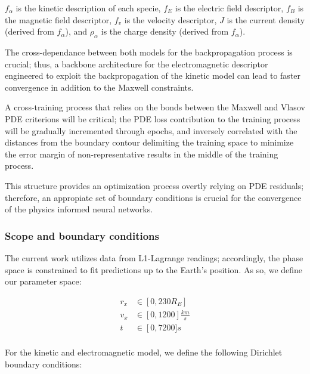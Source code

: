 \documentclass[12pt]{article}
\begin{document}
$f_\alpha$ is the kinetic description of each specie, $f_E$ is the electric field descriptor, $f_B$ is the magnetic field descriptor, $f_v$ is the velocity descriptor, $J$ is the current density (derived from $f_\alpha$), and $\rho_\alpha$ is the charge density (derived from $f_\alpha$).

The cross-dependance between both models for the backpropagation process is crucial; thus, a backbone architecture for the electromagnetic descriptor engineered to exploit the backpropagation of the kinetic model can lead to faster convergence in addition to the Maxwell constraints.

A cross-training process that relies on the bonds between the Maxwell and Vlasov PDE criterions will be critical; the PDE loss contribution to the training process will be gradually incremented through epochs, and inversely correlated with the distances from the boundary contour delimiting the training space to minimize the error margin of non-representative results in the middle of the training process.

This structure provides an optimization process overtly relying on PDE residuals; therefore, an appropiate set of boundary conditions is crucial for the convergence of the physics informed neural networks.

\subsubsection{Scope and boundary conditions}
The current work utilizes data from L1-Lagrange readings; accordingly, the phase space is constrained to fit predictions up to the Earth's position. As so, we define our parameter space:

\begin{align*}
    r_x &\in \left[0, 230R_E\right] \\
    v_x &\in \left[0, 1200\right]\frac{km}{s} \\
    t &\in \left[0, 7200]s \\
\end{align*}

For the kinetic and electromagnetic model, we define the following Dirichlet boundary conditions:
\end{document}
